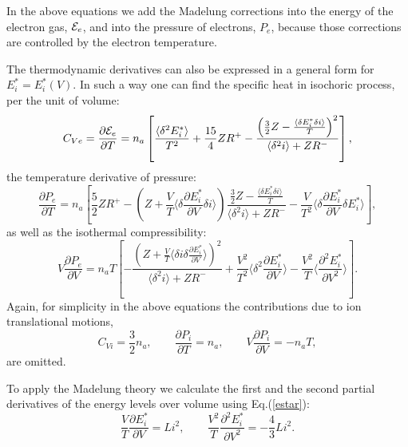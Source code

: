 In the above equations we add the Madelung corrections into the energy of the electron gas, ${\cal E}_e$, and
into the pressure of electrons, $P_e$, because those corrections are controlled by the electron temperature.

The thermodynamic derivatives can also be expressed in a general form for $E^*_i=E^*_i(V)$.
In such a way one can find the specific heat in isochoric process, per the unit of volume:
\begin{equation}\label{generalCv}
C_{Ve}=\frac{\partial {\cal E}_e}{\partial T}=n_a\left[\frac{\langle\delta^2 E^*_i \rangle}{T^2}+\frac{15}4ZR^+
-\frac{\left(\frac32Z-\frac{\langle\delta E^*_i \delta i\rangle}T\right)^2}{\langle\delta^2i\rangle+ZR^-}\right],
\end{equation}
the temperature derivative of pressure:
\begin{equation}\label{generalPT}
\frac {\partial P_e}{\partial T}=
n_a\left[
	\frac52 Z R^+ -
	\left( Z+\frac{V}{T} \langle \delta \frac{\partial E^*_i}{\partial V} \delta i \rangle \right)
		\frac{\frac32Z-\frac{\langle\delta E^*_i \delta i\rangle}T}{\langle\delta^2i\rangle+ZR^-} -
	\frac{V}{T^2} \langle \delta \frac{\partial E^*_i}{\partial V} \delta E^*_i \rangle
\right],
\end{equation}
as well as the isothermal compressibility:
\begin{equation}\label{generalCompr}
V\frac{\partial P_e}{\partial V}=
n_a T \left[ -\frac{\left(Z + \frac{V}{T} \langle \delta i \delta \frac{\partial E^*_i}{\partial V} \rangle \right)^2}
{\langle \delta^2 i \rangle + ZR^-} +
\frac{V^2}{T^2} \langle \delta^2 \frac{\partial E^*_i}{\partial V} \rangle -
\frac{V^2}{T} \langle \frac{\partial^2 E^*_i}{\partial V^2} \rangle
\right].
\end{equation}
Again, for simplicity in the above equations the contributions due to ion translational motions,
\begin{equation}
C_{Vi}=\frac32n_a, \qquad
\frac{\partial P_i}{\partial T}=n_a, \qquad
V\frac{\partial P_i}{\partial V}=-n_aT,
\end{equation}
are omitted.

To apply the Madelung theory we calculate the first and the second partial derivatives
of the energy levels over volume using Eq.(\ref{estar}):
\begin{equation}\label{estarprime}
\frac{V}{T} \frac{\partial E^*_i}{\partial V} = L i^2, \qquad
\frac{V^2}{T} \frac{\partial^2 E^*_i}{\partial V^2} = -\frac43 L i^2.
\end{equation}

